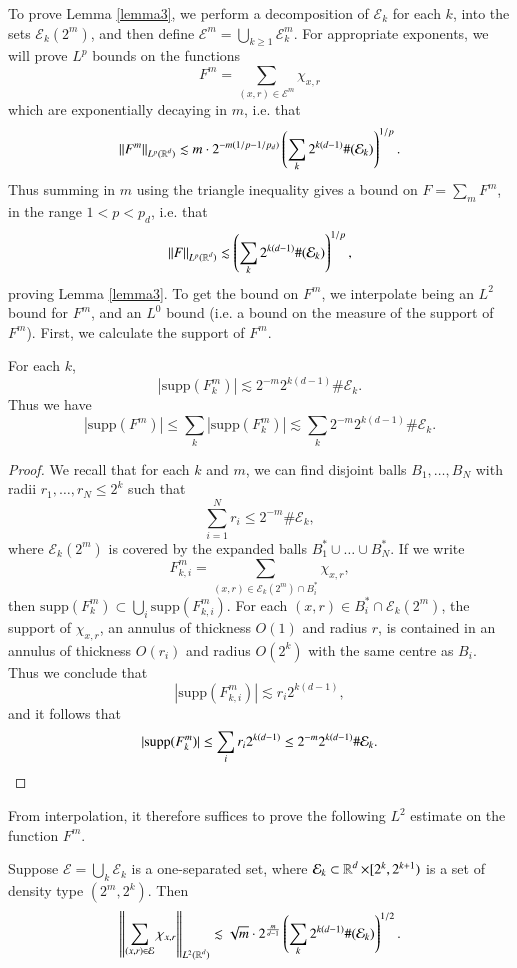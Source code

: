 To prove Lemma \ref{lemma3}, we perform a decomposition of $\mathcal{E}_k$ for each $k$, into the sets $\mathcal{E}_k(2^m)$, and then define $\mathcal{E}^m = \bigcup_{k \geq 1} \mathcal{E}_k^m$. For appropriate exponents, we will prove $L^p$ bounds on the functions
%
\[ F^m = \sum_{(x,r) \in \mathcal{E}^m} \chi_{x,r} \]
%
which are exponentially decaying in $m$, i.e. that
%
\[ \| F^m \|_{L^p(\operatorname{\mathbb{R}}^d)} \lesssim m \cdot 2^{-m(1/p - 1/p_d)} \left( \sum_k 2^{k(d-1)} \#(\mathcal{E}_k) \right)^{1/p}. \]
%
Thus summing in $m$ using the triangle inequality gives a bound on $F = \sum_m F^m$, in the range $1 < p < p_d$, i.e. that
%
\[ \| F \|_{L^p(\operatorname{\mathbb{R}}^d)} \lesssim \left( \sum_k 2^{k(d-1)} \#(\mathcal{E}_k) \right)^{1/p}, \]
%
proving Lemma \ref{lemma3}. To get the bound on $F^m$, we interpolate being an $L^2$ bound for $F^m$, and an $L^0$ bound (i.e. a bound on the measure of the support of $F^m$). First, we calculate the support of $F^m$.

\begin{lemma} \label{lemma5}
    For each $k$,
    \[ |\text{supp}(F^m_k)| \lesssim 2^{-m} 2^{k(d-1)} \# \mathcal{E}_k. \]
    Thus we have
    \[ |\text{supp}(F^m)| \leq \sum_k |\text{supp}(F^m_k)| \lesssim \sum_k 2^{-m} 2^{k(d-1)} \# \mathcal{E}_k. \]
\end{lemma}
\begin{proof}
    We recall that for each $k$ and $m$, we can find disjoint balls $B_1,\dots,B_N$ with radii $r_1,\dots,r_N \leq 2^k$ such that
    \[ \sum_{i = 1}^N r_i \leq 2^{-m} \# \mathcal{E}_k, \]
    where $\mathcal{E}_k(2^m)$ is covered by the expanded balls $B_1^* \cup \dots \cup B_N^*$. If we write
    \[ F^m_{k,i} = \sum_{(x,r) \in \mathcal{E}_k(2^m) \cap B_i^*} \chi_{x,r}, \]
    then $\text{supp}(F^m_k) \subset \bigcup_i \text{supp}(F^m_{k,i})$. For each $(x,r) \in B_i^* \cap \mathcal{E}_k(2^m)$, the support of $\chi_{x,r}$, an annulus of thickness $O(1)$ and radius $r$, is contained in an annulus of thickness $O(r_i)$ and radius $O(2^k)$ with the same centre as $B_i$. Thus we conclude that
    \[ |\text{supp}(F^m_{k,i})| \lesssim r_i 2^{k(d-1)}, \]
    and it follows that
    \[ |\text{supp}(F^m_k)| \leq \sum_i r_i 2^{k(d-1)} \leq 2^{-m} 2^{k(d-1)} \# \mathcal{E}_k. \qedhere \]
\end{proof}

From interpolation, it therefore suffices to prove the following $L^2$ estimate on the function $F^m$.

\begin{lemma} \label{lemma6}
    Suppose $\mathcal{E} = \bigcup_k \mathcal{E}_k$ is a one-separated set, where $\mathcal{E}_k \subset \operatorname{\mathbb{R}}^d \times [2^k,2^{k+1})$ is a set of density type $(2^m, 2^k)$. Then
    \[ \left\| \sum_{(x,r) \in \mathcal{E}} \chi_{x,r} \right\|_{L^2(\operatorname{\mathbb{R}}^d)} \lesssim \sqrt{m} \cdot 2^{ \frac{m}{d-1} } \left( \sum_k 2^{k(d-1)} \#(\mathcal{E}_k) \right)^{1/2}. \]
\end{lemma}

